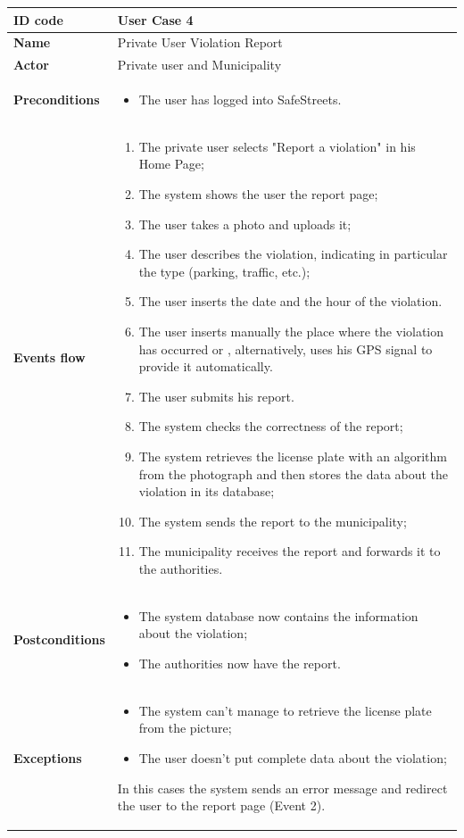 \documentclass[titlepage]{article}
\begin{document}
\begin{longtable}{| p{3 cm} | p{10 cm} |} 
\hline

\textbf{ID code} & User Case 4 \\ \hline
\textbf{Name} & Private User Violation Report \\ \hline
\textbf{Actor} & Private user and Municipality\\ \hline
\textbf{Preconditions} & 
\begin{itemize}
\item The user has logged into SafeStreets.
\end{itemize} \\ \hline
\textbf{Events flow} &
\begin{enumerate}
\item The private user selects "Report a violation" in his Home Page;
\item The system shows the user the report page;
\item The user takes a photo and uploads it;
\item The user describes the violation, indicating in particular the type (parking, traffic, etc.);
\item The user inserts the date and the hour of the violation.
\item The user inserts manually the place where the violation has occurred or , alternatively, uses his GPS signal to provide it automatically.
\item The user submits his report.
\item The system checks the correctness of the report;
\item The system retrieves the license plate with an algorithm from the photograph and then stores the data about the violation in its database;
\item The system sends the report to the municipality;
\item The municipality receives the report and forwards it to the authorities.
\end{enumerate} \\ \hline
\textbf{Postconditions} & 
\begin{itemize}
\item The system database now contains the information about the violation;
\item The authorities now have the report.
\end{itemize} \\ \hline
\textbf{Exceptions} & 
\begin{itemize}
\item The system can't manage to retrieve the license plate from the picture;
\item The user doesn't put complete data about the violation; 
\end{itemize}
In this cases the system sends an error message and redirect the user to the report page (Event 2). \\ \hline
\end{longtable}
\end{document}
